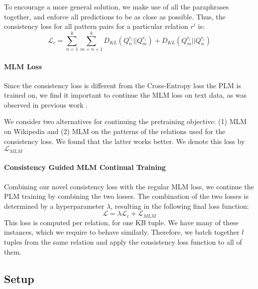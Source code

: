 To encourage a more general solution, we make use of all the paraphrases together, and enforce all predictions to be as close as possible.
Thus, the consistency loss for all pattern pairs for a particular relation $r^i$ is:
\[
\mathcal{L}_{c} = \sum_{n=1}^k \sum_{m=n+1}^k D_{KL}(Q^{r_i}_n||Q^{r_i}_m) + D_{KL}(Q^{r_i}_m||Q^{r_i}_n)
\]


\paragraph{MLM Loss}
Since the consistency loss is different from the Cross-Entropy loss the PLM is trained on, we find it important to continue the MLM loss on text data, as was observed in previous work \cite{geva2020injecting}.

We consider two alternatives for continuing the pretraining objective: (1) MLM on Wikipedia and (2) MLM on the patterns of the relations used for the consistency loss. We found that the latter works better. We denote this loss by $\mathcal{L}_{MLM}$


\paragraph{Consistency Guided MLM Continual Training}

Combining our novel consistency loss with
the regular MLM loss, we continue the PLM training by
combining the two losses. The combination of the two losses
is determined by a hyperparameter $\lambda$, resulting in
the following final loss function:
\[
\mathcal{L} = \lambda \mathcal{L}_c + \mathcal{L}_{MLM}
\]
This loss is computed per relation, for one KB tuple. We have many of these instances, which we require to behave similarly. Therefore, we batch together $l$ tuples from the same relation and apply the consistency loss function to all of them.




\subsection{Setup}


